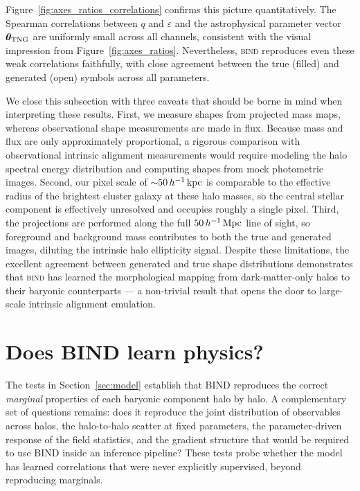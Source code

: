 \documentclass[linenumbers,trackchanges, twocolumn]{aastex701}
\begin{document}
Figure~\ref{fig:axes_ratios_correlations} confirms this picture quantitatively. The Spearman correlations between $q$ and $\varepsilon$ and the astrophysical parameter vector $\boldsymbol{\theta}_{\rm TNG}$ are uniformly small across all channels, consistent with the visual impression from Figure~\ref{fig:axes_ratios}. Nevertheless, \textsc{bind} reproduces even these weak correlations faithfully, with close agreement between the true (filled) and generated (open) symbols across all parameters.

We close this subsection with three caveats that should be borne in mind when interpreting these results. First, we measure shapes from projected mass maps, whereas observational shape measurements are made in flux. Because mass and flux are only approximately proportional, a rigorous comparison with observational intrinsic alignment measurements would require modeling the halo spectral energy distribution and computing shapes from mock photometric images. Second, our pixel scale of ${\sim}50\,h^{-1}\,{\rm kpc}$ is comparable to the effective radius of the brightest cluster galaxy at these halo masses, so the central stellar component is effectively unresolved and occupies roughly a single pixel. Third, the projections are performed along the full $50\,h^{-1}\,{\rm Mpc}$ line of sight, so foreground and background mass contributes to both the true and generated images, diluting the intrinsic halo ellipticity signal. Despite these limitations, the excellent agreement between generated and true shape distributions demonstrates that \textsc{bind} has learned the morphological mapping from dark-matter-only halos to their baryonic counterparts — a non-trivial result that opens the door to large-scale intrinsic alignment emulation.

\section{Does BIND learn physics?}
\label{sec:results}

The tests in Section~\ref{sec:model} establish that \textsc{BIND} reproduces the correct \emph{marginal} properties of each baryonic component halo by halo. A complementary set of questions remains: does it reproduce the joint distribution of observables across halos, the halo-to-halo scatter at fixed parameters, the parameter-driven response of the field statistics, and the gradient structure that would be required to use \textsc{BIND} inside an inference pipeline? These tests probe whether the model has learned correlations that were never explicitly supervised, beyond reproducing marginals.
\end{document}
